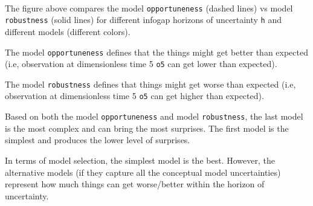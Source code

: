 \documentclass[11pt]{article}
\begin{document}
    \begin{center}
    \end{center}
    { \hspace*{\fill} \\}
    
    \begin{Verbatim}[commandchars=\\\{\}]

    \end{Verbatim}

    The figure above compares the model \texttt{opportuneness} (dashed
lines) vs model \texttt{robustness} (solid lines) for different infogap
horizons of uncertainty \texttt{h} and different models (different
colors).

The model \texttt{opportuneness} defines that the things might get
better than expected (i.e, observation at dimensionless time 5
\texttt{o5} can get lower than expected).

The model \texttt{robustness} defines that things might get worse than
expected (i.e, observation at dimensionless time 5 \texttt{o5} can get
higher than expected).

Based on both the model \texttt{opportuneness} and model
\texttt{robustness}, the last model is the most complex and can bring
the most surprises. The first model is the simplest and produces the
lower level of surprises.

In terms of model selection, the simplest model is the best. However,
the alternative models (if they capture all the conceptual model
uncertainties) represent how much things can get worse/better within the
horizon of uncertainty.


    
    
    
\end{document}

